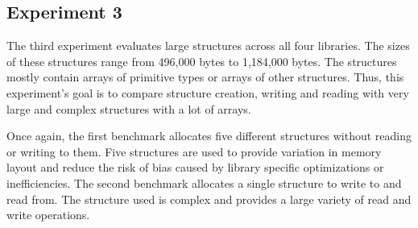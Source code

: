 \subsection{Experiment 3}\label{subsec:experiment-3}

The third experiment evaluates large structures across all four libraries.
The sizes of these structures range from 496,000 bytes to 1,184,000 bytes.
The structures mostly contain arrays of primitive types or arrays of other structures.
Thus, this experiment’s goal is to compare structure creation, writing and reading with very large and complex structures
with a lot of arrays.

Once again, the first benchmark allocates five different structures without reading or writing to them.
Five structures are used to provide variation in memory layout and reduce the risk of bias caused by library specific
optimizations or inefficiencies.
The second benchmark allocates a single structure to write to and read from.
The structure used is complex and provides a large variety of read and write operations.






